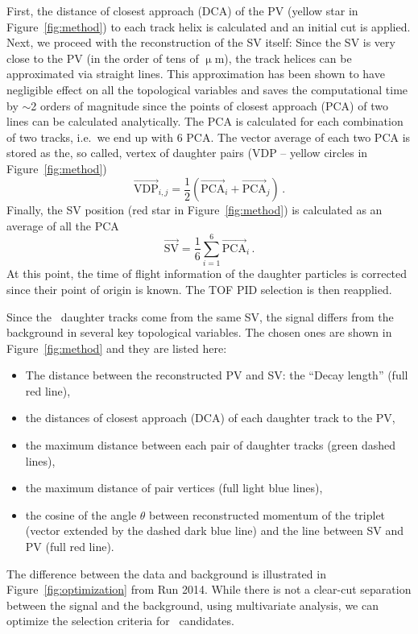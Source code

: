 First, the distance of closest approach (DCA) of the PV (yellow star in Figure~\ref{fig:method}) to each track helix is calculated and an initial cut is applied. Next, we proceed with the reconstruction of the SV itself\@: Since the SV is very close to the PV (in the order of tens of $\upmu$m), the track helices can be approximated via straight lines. This approximation has been shown to have negligible effect on all the topological variables and saves the computational time by $\sim$2 orders of magnitude since the points of closest approach (PCA) of two lines can be calculated analytically. The PCA is calculated for each combination of two tracks, i.e.\ we end up with 6 PCA\@. The vector average of each two PCA is stored as the, so called, vertex of daughter pairs (VDP -- yellow circles in Figure~\ref{fig:method})
\begin{equation}
\overrightarrow{\mathrm{VDP}}_{i,j} = \frac{1}{2} \left( \overrightarrow{\mathrm{PCA}}_i + \overrightarrow{\mathrm{PCA}}_j \right)\,. 
\end{equation}
Finally, the SV position (red star in Figure~\ref{fig:method}) is calculated as an average of all the PCA
\begin{equation}
\overrightarrow{\mathrm{SV}}=\frac{1}{6}\sum_{i=1}^6 \overrightarrow{\mathrm{PCA}}_i \,.
\end{equation}
At this point, the time of flight information of the daughter particles is corrected since their point of origin is known. The TOF PID selection is then reapplied.


Since the \Lambdac\ daughter tracks come from the same SV, the signal differs from the background in several key topological variables. The chosen ones are shown in Figure~\ref{fig:method} and they are listed here:
\begin{itemize}
 \item The distance between the reconstructed PV and SV\@: the ``Decay length'' (full red line),
 \item the distances of closest approach (DCA) of each daughter track to the PV,
 \item the maximum distance between each pair of daughter tracks (green dashed lines),
 \item the maximum distance of pair vertices (full light blue lines),
 \item the cosine of the angle $\theta$ between reconstructed momentum of the triplet (vector extended by the dashed dark blue line) and the line between SV and PV (full red line).
\end{itemize}
The difference between the data and background is illustrated in Figure~\ref{fig:optimization} from Run 2014\@. While there is not a clear-cut separation between the signal and the background, using multivariate analysis, we can optimize the selection criteria for \Lambdac\ candidates.

